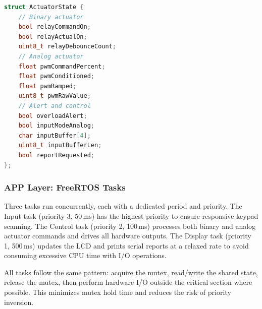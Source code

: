 \begin{lstlisting}[language=C++, caption=Shared state structure (shared\_state.h), label=lst:shared_state_h]
struct ActuatorState {
    // Binary actuator
    bool relayCommandOn;
    bool relayActualOn;
    uint8_t relayDebounceCount;
    // Analog actuator
    float pwmCommandPercent;
    float pwmConditioned;
    float pwmRamped;
    uint8_t pwmRawValue;
    // Alert and control
    bool overloadAlert;
    bool inputModeAnalog;
    char inputBuffer[4];
    uint8_t inputBufferLen;
    bool reportRequested;
};
\end{lstlisting}

\subsubsection{APP Layer: FreeRTOS Tasks}

Three tasks run concurrently, each with a dedicated period and priority. The Input task (priority 3, 50\,ms) has the highest priority to ensure responsive keypad scanning. The Control task (priority 2, 100\,ms) processes both binary and analog actuator commands and drives all hardware outputs. The Display task (priority 1, 500\,ms) updates the LCD and prints serial reports at a relaxed rate to avoid consuming excessive CPU time with I/O operations.

All tasks follow the same pattern: acquire the mutex, read/write the shared state, release the mutex, then perform hardware I/O outside the critical section where possible. This minimizes mutex hold time and reduces the risk of priority inversion.
